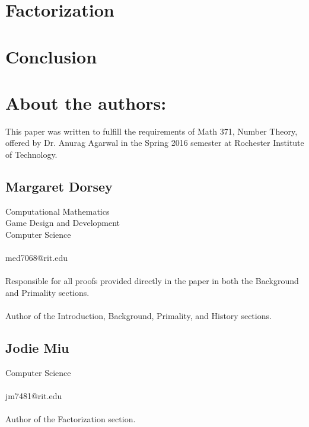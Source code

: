 \documentclass{article}
\begin{document}
\section*{Factorization}\label{Factorization}

\section*{Conclusion}\label{Conclusion}

\newpage

\nocite{*}
         






\section*{About the authors:}


\par This paper was written to fulfill the requirements of Math 371, Number Theory, offered by Dr. Anurag Agarwal
in the Spring 2016 semester at Rochester Institute of Technology.
\subsection*{Margaret Dorsey}
   Computational Mathematics
   \\Game Design and Development
   \\Computer Science
   \\
   \\ med7068@rit.edu
  \\
  \\ Responsible for all proofs provided directly in the paper in both the Background and Primality sections.
  \\
  \\ Author of the Introduction, Background, Primality, and History sections.

\subsection*{Jodie Miu}
   Computer Science
   \\
   \\ jm7481@rit.edu 
   \\
   \\ Author of the Factorization section.
   
\end{document}
